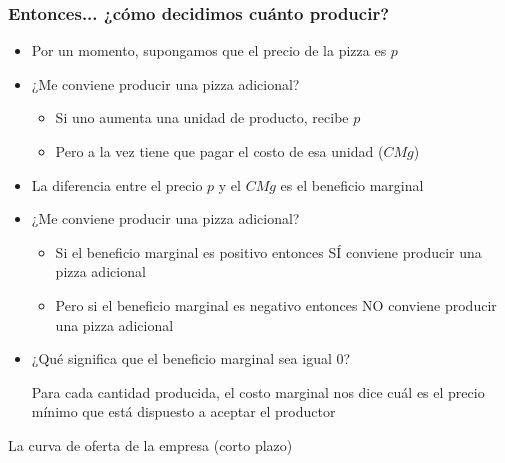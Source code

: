 \documentclass{beamer}
\begin{document}
\begin{frame}
\frametitle{Entonces... ¿cómo decidimos cuánto producir?}
    \begin{itemize}
        \item Por un momento, supongamos que el precio de la pizza es $p$
            \item ¿Me conviene producir una pizza adicional?  
        \begin{itemize}
            \item Si uno aumenta una unidad de producto, recibe $p$
            \item Pero a la vez tiene que pagar el costo de esa unidad ($CMg$)
        \end{itemize}
        \item La diferencia entre el precio $p$ y el $CMg$ es el beneficio marginal
        \item ¿Me conviene producir una pizza adicional?
        \begin{itemize}
            \item Si el beneficio marginal es positivo entonces SÍ conviene producir una pizza adicional
            \item Pero si el beneficio marginal es negativo entonces NO conviene producir una pizza adicional
        \end{itemize} 
        \item ¿Qué significa que el beneficio marginal sea igual 0?
        \begin{boxB}
            \centering
            Para cada cantidad producida, el costo marginal nos dice cuál es el precio mínimo que está dispuesto a aceptar el productor
        \end{boxB}
    \end{itemize}
\end{frame}

\begin{frame}{La curva de oferta de la empresa (corto plazo)}
\begin{figure}[H]
    \renewcommand{\figurename}{Figure}
    \begin{center}
    \end{center}
    \end{figure}
\end{frame}
\end{document}

